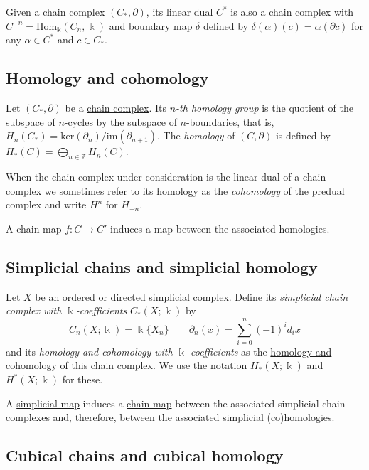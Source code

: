 \documentclass{amsart}
\begin{document}
	Given a chain complex $(C_*, \partial)$, its linear dual $C^*$ is also a chain complex with $C^{-n} = \mathrm{Hom_\Bbbk}(C_n, \Bbbk)$ and boundary map $\delta$ defined by $\delta(\alpha)(c) = \alpha(\partial c)$ for any $\alpha \in C^*$ and $c \in C_*$.
	
	\subsection*{Homology and cohomology} \label{homology and cohomology}
	
	Let $(C_*, \partial)$ be a \hyperref[chain complex]{chain complex}. Its \textit{$n$-th homology group} is the quotient of the subspace of $n$-cycles by the subspace of $n$-boundaries, that is, $H_n(C_*) = \mathrm{ker}(\partial_n)/ \mathrm{im}(\partial_{n+1})$. The \textit{homology} of $(C, \partial)$ is defined by $H_*(C) = \bigoplus_{n \in \mathbb Z} H_n(C)$.
	
	When the chain complex under consideration is the linear dual of a chain complex we sometimes refer to its homology as the \textit{cohomology} of the predual complex and write $H^n$ for $H_{-n}$.
	
	A chain map $f : C \to C'$ induces a map between the associated homologies.
	
	\subsection*{Simplicial chains and simplicial homology} \label{simplicial chains and simplicial homology}
	
	Let $X$ be an ordered or directed simplicial complex. Define its \textit{simplicial chain complex with $\Bbbk$-coefficients} $C_*(X; \Bbbk)$ by 
	\begin{equation*}
	C_n(X; \Bbbk) = \Bbbk\{X_n\} \qquad \partial_n(x) = \sum_{i=0}^{n} (-1)^i d_ix
	\end{equation*}
	and its \textit{homology and cohomology with $\Bbbk$-coefficients} as the \hyperref[homology and cohomology]{homology and cohomology} of this chain complex. We use the notation $H_*(X; \Bbbk)$ and $H^*(X; \Bbbk)$ for these.
	
	A \hyperref[abstract simplicial complex]{simplicial map} induces a \hyperref[chain complex]{chain map} between the associated simplicial chain complexes and, therefore, between the associated simplicial (co)homologies.
	
	\subsection*{Cubical chains and cubical homology} \label{cubical chains and cubical homology}
	
\end{document}
